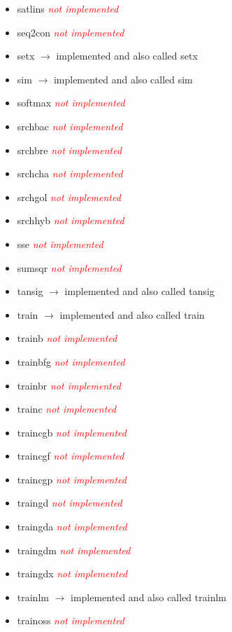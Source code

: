 \begin{itemize}
	\item satlins \textcolor{red}{\textit{not implemented}}
	\item seq2con \textcolor{red}{\textit{not implemented}}
	\item setx $\rightarrow$ implemented and also called setx
	\item sim $\rightarrow$ implemented and also called sim
	\item softmax \textcolor{red}{\textit{not implemented}}
	\item srchbac \textcolor{red}{\textit{not implemented}}
	\item srchbre \textcolor{red}{\textit{not implemented}}
	\item srchcha \textcolor{red}{\textit{not implemented}}
	\item srchgol \textcolor{red}{\textit{not implemented}}
	\item srchhyb \textcolor{red}{\textit{not implemented}}
	\item sse \textcolor{red}{\textit{not implemented}}
	\item sumsqr \textcolor{red}{\textit{not implemented}}
	\item tansig $\rightarrow$ implemented and also called tansig
	\item train $\rightarrow$ implemented and also called train
	\item trainb \textcolor{red}{\textit{not implemented}}
	\item trainbfg \textcolor{red}{\textit{not implemented}}
	\item trainbr \textcolor{red}{\textit{not implemented}}
	\item trainc \textcolor{red}{\textit{not implemented}}
	\item traincgb \textcolor{red}{\textit{not implemented}}
	\item traincgf \textcolor{red}{\textit{not implemented}}
	\item traincgp \textcolor{red}{\textit{not implemented}}
	\item traingd \textcolor{red}{\textit{not implemented}}
	\item traingda \textcolor{red}{\textit{not implemented}}
	\item traingdm \textcolor{red}{\textit{not implemented}}
	\item traingdx \textcolor{red}{\textit{not implemented}} 
	\item trainlm $\rightarrow$ implemented and also called trainlm
	\item trainoss \textcolor{red}{\textit{not implemented}}

\end{itemize}

